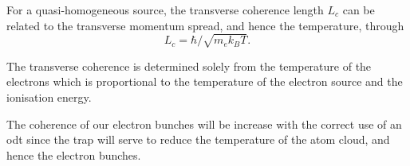 For a quasi-homogeneous source\cite{nugent_coherent_2009}, the transverse coherence length $L_c$ can be related to the transverse momentum spread, and hence the temperature, through\cite{van_oudheusden_electron_2007}
\begin{equation}
L_c = \hbar/\sqrt{m_e k_B T}.
\end{equation}

The transverse coherence is determined solely from the temperature of the electrons which is proportional to the temperature of the electron source and the ionisation energy.

The coherence of our electron bunches will be increase with the correct use of an \gls{odt} since the trap will serve to reduce the temperature of the atom cloud, and hence the electron bunches.


